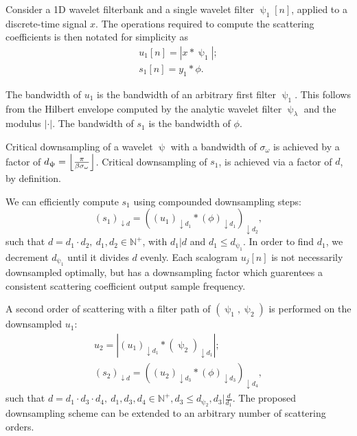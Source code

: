 Consider a 1D wavelet filterbank and a single wavelet filter $\uppsi_1[n]$, applied to a discrete-time signal $x$. The operations required to compute the scattering coefficients is then notated for simplicity as
\begin{gather}
    u_1[n] = \left|  x * \uppsi_1   \right|; \\
    s_1[n] = y_1 * \phi.
\end{gather}

The bandwidth of $u_1$ is the bandwidth of an arbitrary first filter $\uppsi_1$. This follows from the Hilbert envelope computed by the analytic wavelet filter $\uppsi_\lambda$ and the modulus $|\cdot |$. The bandwidth of $s_1$ is the bandwidth of $\phi$.

Critical downsampling of a wavelet $\uppsi$ with a bandwidth of $\sigma_\omega$ is achieved by a factor of $d_{\uppsi} = \floor*{\frac{ \pi }{\beta\sigma_\omega}}$. Critical downsampling of $s_1$, is achieved via a factor of $d$, by definition.

We can efficiently compute $s_1$ using compounded downsampling steps:
\begin{equation}
    \left(s_1\right)_{\downarrow d} = \left( \left(u_1\right)_{\downarrow d_1} * (\phi)_{\downarrow d_1}\right)_{\downarrow d_2},
\end{equation}
such that $d = d_1 \cdot d_2, \ d_1, d_2 \in \mathbb{N}^+$, with $d_1 | d$ and $d_1 \le  d_{\uppsi_1}$. In order to find $d_1$, we decrement $d_{\uppsi_1}$ until it divides $d$ evenly. Each scalogram $u_j[n]$ is not necessarily downsampled optimally, but has a downsampling factor which guarentees a consistent scattering coefficient output sample frequency. 


A second order of scattering with a filter path of $(\uppsi_1, \uppsi_2)$ is performed on the downsampled $u_1$:
\begin{gather}
    u_2 = \left|  \left(u_1\right)_{\downarrow d_1} * (\uppsi_2)_{\downarrow d_1}  \right|; \\
    \left(s_2\right)_{\downarrow d} = \left( \left(u_2\right)_{\downarrow d_3} * (\phi)_{\downarrow d_3}\right)_{\downarrow d_4},
\end{gather}
such that $d = d_1 \cdot d_3 \cdot d_4, \ d_1, d_3, d_4 \in \mathbb{N}^+, d_3 \le d_{\uppsi_2}, d_3 | \frac{d}{d_1}$. The proposed downsampling scheme can be extended to an arbitrary number of scattering orders.

